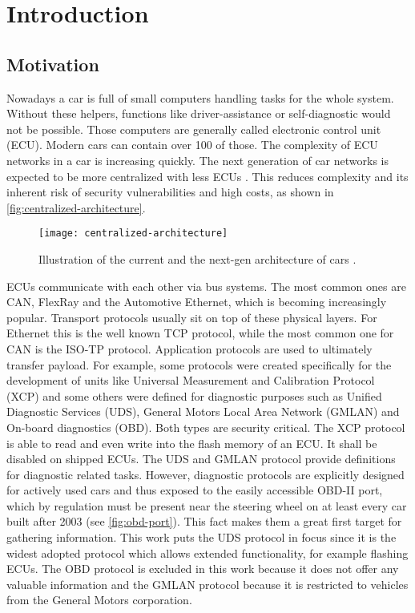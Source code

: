 \section{Introduction}

\subsection{Motivation}
Nowadays a car is full of small computers handling tasks for the whole system. Without these helpers, functions like driver-assistance or self-diagnostic would not be possible. Those computers are generally called electronic control unit (ECU). Modern cars can contain over 100 of those. The complexity of ECU networks in a car is increasing quickly. The next generation of car networks is expected to be more centralized with less ECUs \cite{car-architecture}. This reduces complexity and its inherent risk of security vulnerabilities and high costs, as shown in \autoref{fig:centralized-architecture}.

\begin{figure}[h]
    \centering
    \texttt{[image: centralized-architecture]}
    \caption{Illustration of the current and the next-gen architecture of cars \cite{car-architecture}.}
    \label{fig:centralized-architecture}
\end{figure}

ECUs communicate with each other via bus systems. The most common ones are CAN, FlexRay and the Automotive Ethernet, which is becoming increasingly popular. Transport protocols usually sit on top of these physical layers. For Ethernet this is the well known TCP protocol, while the most common one for CAN is the ISO-TP protocol. Application protocols are used to ultimately transfer payload. For example, some protocols were created specifically for the development of units like Universal Measurement and Calibration Protocol (XCP) and some others were defined for diagnostic purposes such as Unified Diagnostic Services (UDS), General Motors Local Area Network (GMLAN) and On-board diagnostics (OBD). Both types are security critical. The XCP protocol is able to read and even write into the flash memory of an ECU. It shall be disabled on shipped ECUs. The UDS and GMLAN protocol provide definitions for diagnostic related tasks. However, diagnostic protocols are explicitly designed for actively used cars and thus exposed to the easily accessible OBD-II port, which by regulation must be present near the steering wheel on at least every car built after 2003 (see \autoref{fig:obd-port}). This fact makes them a great first target for gathering information. This work puts the UDS protocol in focus since it is the widest adopted protocol which allows extended functionality, for example flashing ECUs. The OBD protocol is excluded in this work because it does not offer any valuable information and the GMLAN protocol because it is restricted to vehicles from the General Motors corporation.

